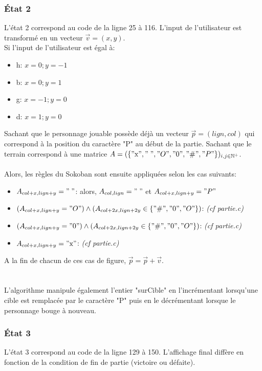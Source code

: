 \documentclass[10pt,a4paper,french,titlepage]{article}
\begin{document}
\subsubsection*{État 2}
L'état 2 correspond au code de la ligne 25 à 116. L'input de l'utilisateur est transformé en un vecteur $\vec{v}=(x,y)$.\\
Si l'input de l'utilisateur est égal à:
\begin{itemize}
\item h: $x=0;y=-1$
\item b: $x=0;y=1$
\item g: $x=-1;y=0$
\item d: $x=1;y=0$
\end{itemize}
Sachant que le personnage jouable possède déjà un vecteur $\vec{p}=(lign,col)$ qui correspond à la position du caractère "P" au début de la partie. Sachant que le terrain correspond à une matrice $A=(\{"\mbox{x}","\;","O","0","\#","P"\})_{i,j\in \mathbb{N}^+}$.\\\\
Alors, les règles du Sokoban sont ensuite appliquées selon les cas suivants:
\begin{itemize}
\item $A_{col+x,lign+y}="\;"$: alors, $A_{col,lign}="\;"$ et $A_{col+x,lign+y}="P"$
\item $(A_{col+x,lign+y}="O") \land (A_{col+2x,lign+2y}\in \{"\#","0","O"\})$: \textit{(cf partie.c)}
\item $(A_{col+x,lign+y}="0") \land (A_{col+2x,lign+2y}\in \{"\#","0","O"\})$: \textit{(cf partie.c)}
\item $A_{col+x,lign+y}="\mbox{x}"$: \textit{(cf partie.c)}
\end{itemize}


A la fin de chacun de ces cas de figure, $\vec{p}=\vec{p}+\vec{v}$.\\
\\\\
L'algorithme manipule également l'entier "surCible" en l'incrémentant lorsqu'une cible est remplacée par le caractère "P" puis en le décrémentant lorsque le personnage bouge à nouveau.

\subsubsection*{État 3}
L'état 3 correspond au code de la ligne 129 à 150. L'affichage final diffère en fonction de la condition de fin de partie (victoire ou défaite).
\end{document}
